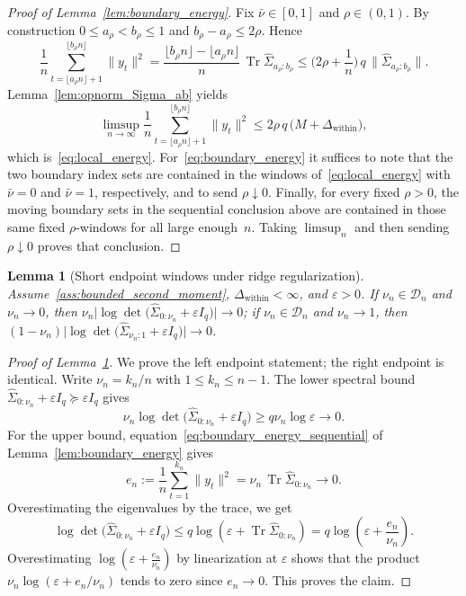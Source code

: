 \documentclass[10pt, letterpaper]{amsart}
\DeclareMathOperator{\Tr}{Tr}
\newtheorem{lem}[theorem]{Lemma}
\begin{document}
\begin{proof}[Proof of Lemma~\ref{lem:boundary_energy}]
Fix $\bar\nu\in[0,1]$ and $\rho\in(0,1)$. By construction $0\leq a_\rho<b_\rho\leq1$ and $b_\rho-a_\rho\leq2\rho$. Hence
\[
\frac1n\sum_{t=\lfloor a_\rho n\rfloor+1}^{\lfloor b_\rho n\rfloor}\|y_t\|^2
=\frac{\lfloor b_\rho n\rfloor-\lfloor a_\rho n\rfloor}{n}\,
\Tr\widehat\Sigma_{a_\rho:b_\rho}
\leq
\Big(2\rho+\frac1n\Big)\,q\,\big\|\widehat\Sigma_{a_\rho:b_\rho}\big\|.
\]
 Lemma~\ref{lem:opnorm_Sigma_ab} yields
\[
\limsup_{n\to\infty}
\frac1n\sum_{t=\lfloor a_\rho n\rfloor+1}^{\lfloor b_\rho n\rfloor}\|y_t\|^2
\leq
2\rho\,q\,\big(M+\Delta_{\mathrm{within}}\big),
\]
which is~\eqref{eq:local_energy}. For~\eqref{eq:boundary_energy} it suffices to note that the two boundary index sets are contained in the windows of~\eqref{eq:local_energy} with $\bar\nu=0$ and $\bar\nu=1$, respectively, and to send $\rho\downarrow0$. Finally, for every fixed $\rho>0$, the moving boundary sets in the sequential conclusion above are contained in those same fixed $\rho$-windows for all large enough~$n$. Taking $\limsup_n$ and then sending $\rho\downarrow0$ proves that conclusion.

\end{proof}

\begin{lem}[Short endpoint windows under ridge regularization]\label{lem:boundary_logdet}
Assume~\ref{ass:bounded_second_moment}, $\Delta_{\mathrm{within}}<\infty$, and $\varepsilon>0$. If $\nu_n\in\mathcal D_n$ and $\nu_n\to0$, then $\nu_n\bigl|\log\det\big(\widehat\Sigma_{0:\nu_n}+\varepsilon I_q\big)\bigr|\longrightarrow0$; if $\nu_n\in\mathcal D_n$ and $\nu_n\to1$, then $(1-\nu_n)\bigl|\log\det\big(\widehat\Sigma_{\nu_n:1}+\varepsilon I_q\big)\bigr|\longrightarrow0$.
\end{lem}

\begin{proof}[Proof of Lemma~\ref{lem:boundary_logdet}]
We prove the left endpoint statement; the right endpoint is identical. Write $\nu_n=k_n/n$ with $1\leq k_n\leq n-1$. The lower spectral bound $\widehat\Sigma_{0:\nu_n}+\varepsilon I_q\succeq \varepsilon I_q$ gives
\[
\nu_n\log\det\big(\widehat\Sigma_{0:\nu_n}+\varepsilon I_q\big)
\geq q\nu_n\log \varepsilon \longrightarrow0.
\]
For the upper bound,  equation~\eqref{eq:boundary_energy_sequential} of Lemma~\ref{lem:boundary_energy} gives
\[
e_n:=\frac1n\sum_{t=1}^{k_n}\|y_t\|^2
=\nu_n\,\Tr\widehat\Sigma_{0:\nu_n}
\longrightarrow0.
\]
Overestimating the eigenvalues by the trace, we get\[
\log\det\big(\widehat\Sigma_{0:\nu_n}+\varepsilon I_q\big)
\leq q\log\left(\varepsilon+\Tr\widehat\Sigma_{0:\nu_n}\right)
=q\log\left(\varepsilon+\frac{e_n}{\nu_n}\right).
\]
Overestimating $\log\left(\varepsilon+\frac{e_n}{\nu_n}\right)$ by linearization at $\varepsilon$ shows that the product
$\nu_n\log(\varepsilon+e_n/\nu_n)$ tends to zero since $e_n\to0$. This proves the claim.
\end{proof}
\end{document}
